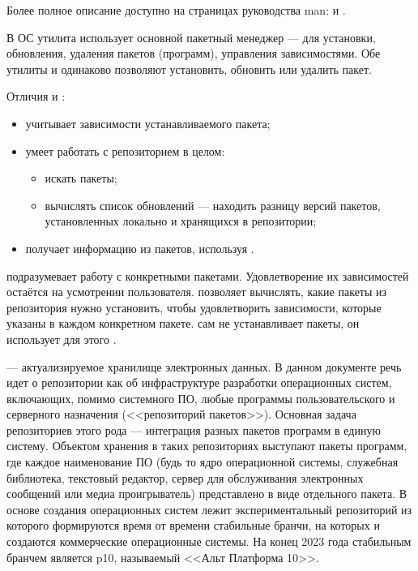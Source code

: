 	Более полное описание доступно на страницах руководства man:
	 и .

В ОС  утилита  использует основной пакетный менеджер  --- 
 для установки, обновления, удаления пакетов (программ), управления зависимостями. Обе 
утилиты  и  одинаково позволяют установить, обновить или удалить пакет.

Отличия  и :
\begin{itemize}
	\item {} учитывает зависимости устанавливаемого пакета;
	\item {} умеет работать с репозиторием в целом:
	\begin{itemize}
		\item искать пакеты;
		\item вычислять список обновлений --- находить разницу версий пакетов, 
			установленных локально и хранящихся в репозитории;
	\end{itemize}
	\item {} получает информацию из пакетов, используя .
\end{itemize}

 подразумевает работу с конкретными пакетами. Удовлетворение их зависимостей остаётся 
на усмотрении пользователя.  позволяет вычислять, какие пакеты из репозитория нужно установить, 
чтобы удовлетворить зависимости, которые указаны в каждом конкретном  пакете.  
сам не устанавливает пакеты, он использует для этого .

	
 --- актуализируемое хранилище электронных данных.
В данном документе речь идет о репозитории как об инфраструктуре разработки операционных систем, включающих, 
помимо системного ПО, любые программы пользовательского и серверного назначения (<<репозиторий пакетов>>). 
Основная задача репозиториев этого рода --- интеграция разных пакетов программ в единую систему. Объектом 
хранения в таких репозиториях выступают пакеты программ, где каждое наименование ПО (будь то ядро операционной 
системы, служебная библиотека, текстовый редактор, сервер для обслуживания электронных сообщений или медиа 
проигрыватель) представлено в виде отдельного пакета. В основе создания операционных систем  лежит 
экспериментальный репозиторий  из которого формируются время от времени стабильные бранчи, 
на которых и создаются коммерческие операционные системы. На конец 2023 года стабильным бранчем является p10, 
называемый <<Альт Платформа 10>>.

